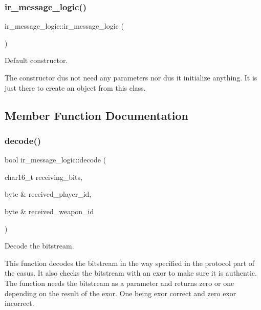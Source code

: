 \subsubsection{\texorpdfstring{ir\+\_\+message\+\_\+logic()}{ir\_message\_logic()}}
{\footnotesize\ttfamily ir\+\_\+message\+\_\+logic\+::ir\+\_\+message\+\_\+logic (\begin{DoxyParamCaption}{ }\end{DoxyParamCaption})\hspace{0.3cm}{\ttfamily [inline]}}



Default constructor. 

The constructor dus not need any parameters nor dus it initialize anything. It is just there to create an object from this class. 

\subsection{Member Function Documentation}
\hypertarget{classir__message__logic_aab003c06594ef0dd7caf33d0c928b11b}{}\label{classir__message__logic_aab003c06594ef0dd7caf33d0c928b11b} 
\subsubsection{\texorpdfstring{decode()}{decode()}}
{\footnotesize\ttfamily bool ir\+\_\+message\+\_\+logic\+::decode (\begin{DoxyParamCaption}\item[{char16\+\_\+t}]{receiving\+\_\+bits,  }\item[{byte \&}]{received\+\_\+player\+\_\+id,  }\item[{byte \&}]{received\+\_\+weapon\+\_\+id }\end{DoxyParamCaption})\hspace{0.3cm}{\ttfamily [inline]}}



Decode the bitstream. 

This function decodes the bitstream in the way specified in the protocol part of the casus. It also checks the bitstream with an exor to make sure it is authentic. The function needs the bitstream as a parameter and returns zero or one depending on the result of the exor. One being exor correct and zero exor incorrect. \hypertarget{classir__message__logic_a60cf2eae7b2ff8285440068b6419863c}{}\label{classir__message__logic_a60cf2eae7b2ff8285440068b6419863c} 
